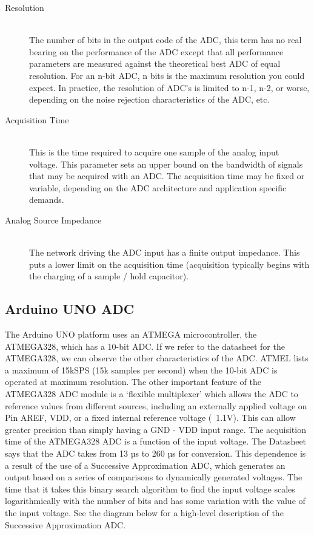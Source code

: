 \documentclass[10pt]{report}
\begin{document}
\begin{description}
  \item[Resolution] \hfill \\
  The number of bits in the output code of the ADC, this term has no real bearing on the performance of the ADC except that all performance parameters are measured against the theoretical best ADC of equal resolution. For an n-bit ADC, n bits is the maximum resolution you could expect. In practice, the resolution of ADC’s is limited to n-1, n-2, or worse, depending on the noise rejection characteristics of the ADC, etc.

  \item[Acquisition Time] \hfill \\
This is the time required to acquire one sample of the analog input voltage. This parameter sets an upper bound on the bandwidth of signals that may be acquired with an ADC. The acquisition time may be fixed or variable, depending on the ADC architecture and application specific demands.

  \item[Analog Source Impedance] \hfill \\
  The network driving the ADC input has a finite output impedance. This puts a lower limit on the acquisition time (acquisition typically begins with the charging of a sample / hold capacitor).
\end{description}


\subsection*{Arduino UNO ADC}
	The Arduino UNO platform uses an ATMEGA microcontroller, the ATMEGA328, which has a 10-bit ADC. If we refer to the datasheet for the ATMEGA328, we can observe the other characteristics of the ADC. ATMEL lists a maximum of 15kSPS (15k samples per second) when the 10-bit ADC is operated at maximum resolution. The other important feature of the ATMEGA328 ADC module is a ‘flexible multiplexer’ which allows the ADC to reference values from different sources, including an externally applied voltage on Pin AREF, VDD, or a fixed internal reference voltage (~1.1V). This can allow greater precision than simply having a GND - VDD input range. The acquisition time of the ATMEGA328 ADC is a function of the input voltage. The Datasheet says that the ADC takes from 13 µs to 260 µs for conversion. This dependence is a result of the use of a Successive Approximation ADC, which generates an output based on a series of comparisons to dynamically generated voltages. The time that it takes this binary search algorithm to find the input voltage scales logarithmically with the number of bits and has some variation with the value of the input voltage. See the diagram below for a high-level description of the Successive Approximation ADC. 
\end{document}

